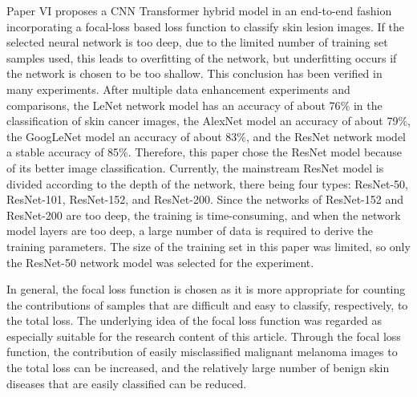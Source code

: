 Paper VI proposes a CNN Transformer hybrid model in an end-to-end fashion incorporating a focal-loss based loss function to classify skin lesion images. If the selected neural network is too deep, due to the limited number of training set samples used, 
this leads to overfitting of the network, but underfitting occurs if the network is chosen to be too shallow. This conclusion has been verified in many experiments. After multiple data enhancement experiments and comparisons, the LeNet network model has an accuracy of about 76$\%$ in the classification of skin cancer images, the AlexNet model an accuracy of about 79$\%$, the GoogLeNet model an accuracy of about 83$\%$, and the ResNet network model a stable accuracy of 85$\%$. Therefore, this paper chose the ResNet model because of its better image classification. Currently, the mainstream ResNet model is divided according to the depth of the network, there being four types: ResNet-50, ResNet-101, ResNet-152, and ResNet-200. Since the networks of ResNet-152 and ResNet-200 are too deep, the training is time-consuming, and when the network model layers are too deep, a large number of data is required to derive the training parameters. The size of the training set in this paper was limited, so only the ResNet-50 network model was selected for the experiment.

In general, the focal loss function is chosen as it is more appropriate for counting the contributions of samples that are difficult and easy to classify, respectively, to the total loss. The underlying idea of the focal loss function was regarded as especially suitable for the research content of this article. Through the focal loss function, the contribution of easily misclassified malignant melanoma images 
 to the total loss can be increased, and the relatively large number of benign skin diseases that are easily classified can be reduced. %





